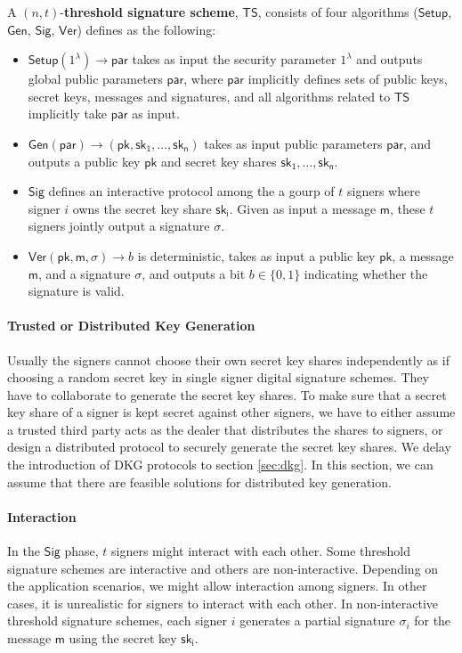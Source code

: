 \begin{definition}
    A $(n, t)$-\textbf{threshold signature scheme}, $\mathsf{TS}$, consists of four algorithms ($\mathsf{Setup}$, $\mathsf{Gen}$, $\mathsf{Sig}$, $\mathsf{Ver}$) defines as the following:
    \begin{itemize}
        \item $\mathsf{Setup}(1^\lambda)\to \mathsf{par}$ takes as input the security parameter $1^\lambda$ and outputs global public parameters $\mathsf{par}$, where $\mathsf{par}$ implicitly defines sets of public keys, secret keys, messages and signatures, and all algorithms related to $\mathsf{TS}$ implicitly take $\mathsf{par}$ as input. 
        \item $\mathsf{Gen(par)}\to (\mathsf{pk, sk_1,\dots, sk_n})$ takes as input public parameters $\mathsf{par}$, and outputs a public key $\mathsf{pk}$ and secret key shares $\mathsf{sk_1, \dots, sk_n}$. 
        \item $\mathsf{Sig}$ defines an interactive protocol among the a gourp of $t$ signers where signer $i$ owns the secret key share $\mathsf{sk_i}$. Given as input a message $\mathsf{m}$, these $t$ signers jointly output a signature $\sigma$. 
        \item $\mathsf{Ver}(\mathsf{pk}, \mathsf{m}, \sigma)\to b$ is deterministic, takes as input a public key $\mathsf{pk}$, a message $\mathsf{m}$, and a signature $\sigma$, and outputs a bit $b\in\{0,1\}$ indicating whether the signature is valid. 
    \end{itemize}
\end{definition}

\paragraph{Trusted or Distributed Key Generation} Usually the signers cannot choose their own secret key shares independently as if choosing a random secret key in single signer digital signature schemes. They have to collaborate to generate the secret key shares. To make sure that a secret key share of a signer is kept secret against other signers, we have to either assume a trusted third party acts as the dealer that distributes the shares to signers, or design a distributed protocol to securely generate the secret key shares. We delay the introduction of DKG protocols to section \ref{sec:dkg}. In this section, we can assume that there are feasible solutions for distributed key generation.  

\paragraph{Interaction} In the $\mathsf{Sig}$ phase, $t$ signers might interact with each other. Some threshold signature schemes are interactive and others are non-interactive. Depending on the application scenarios, we might allow interaction among signers. In other cases, it is unrealistic for signers to interact with each other. In non-interactive threshold signature schemes, each signer $i$ generates a partial signature $\sigma_i$ for the message $\mathsf{m}$ using the secret key $\mathsf{sk_i}$. 

